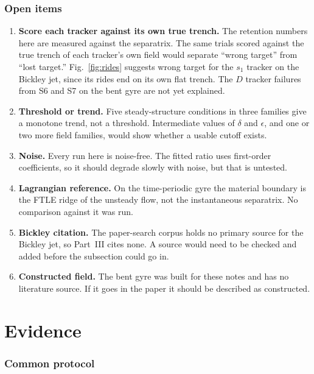 \documentclass[11pt]{article}
\newcommand{\Dtr}{$D$ tracker}
\newcommand{\Str}{$s_1$ tracker}
\begin{document}
\section{Open items}

\begin{enumerate}
\item \textbf{Score each tracker against its own true trench.} The
retention numbers here are measured against the separatrix. The same
trials scored against the true trench of each tracker's own field would
separate ``wrong target'' from ``lost target.'' Fig.~\ref{fig:rides}
suggests wrong target for the \Str{} on the Bickley jet, since its rides
end on its own flat trench. The \Dtr{} failures from S6 and S7 on the bent
gyre are not yet explained.
\item \textbf{Threshold or trend.} Five steady-structure conditions in
three families give a monotone trend, not a threshold. Intermediate
values of $\delta$ and $\epsilon$, and one or two more field families,
would show whether a usable cutoff exists.
\item \textbf{Noise.} Every run here is noise-free. The fitted ratio uses
first-order coefficients, so it should degrade slowly with noise, but that
is untested.
\item \textbf{Lagrangian reference.} On the time-periodic gyre the
material boundary is the FTLE ridge of the unsteady flow, not the
instantaneous separatrix. No comparison against it was run.
\item \textbf{Bickley citation.} The paper-search corpus holds no primary
source for the Bickley jet, so Part~III cites none. A source would need
to be checked and added before the subsection could go in.
\item \textbf{Constructed field.} The bent gyre was built for these notes
and has no literature source. If it goes in the paper it should be
described as constructed.
\end{enumerate}

\part{Evidence}

\section{Common protocol}
\label{sec:protocol}
\end{document}

